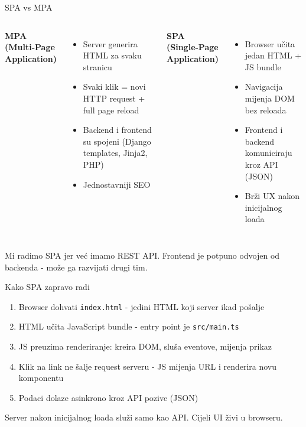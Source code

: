 \begin{frame}{SPA vs MPA}
\begin{columns}[T]
\textbf{MPA (Multi-Page Application)}
\begin{itemize}
  \item Server generira HTML za svaku stranicu
  \item Svaki klik = novi HTTP request + full page reload
  \item Backend i frontend su spojeni (Django templates, Jinja2, PHP)
  \item Jednostavniji SEO
\end{itemize}

\textbf{SPA (Single-Page Application)}
\begin{itemize}
  \item Browser učita jedan HTML + JS bundle
  \item Navigacija mijenja DOM bez reloada
  \item Frontend i backend komuniciraju kroz API (JSON)
  \item Brži UX nakon inicijalnog loada
\end{itemize}
\end{columns}

\vspace{0.6em}
Mi radimo SPA jer već imamo REST API. Frontend je potpuno odvojen od backenda - može ga razvijati drugi tim.
\end{frame}

\begin{frame}{Kako SPA zapravo radi}
\begin{enumerate}
  \item Browser dohvati \texttt{index.html} - jedini HTML koji server ikad pošalje
  \item HTML učita JavaScript bundle - entry point je \texttt{src/main.ts}
  \item JS preuzima renderiranje: kreira DOM, sluša eventove, mijenja prikaz
  \item Klik na link ne šalje request serveru - JS mijenja URL i renderira novu komponentu
  \item Podaci dolaze asinkrono kroz API pozive (JSON)
\end{enumerate}

\vspace{0.4em}
Server nakon inicijalnog loada služi samo kao API. Cijeli UI živi u browseru.
\end{frame}

